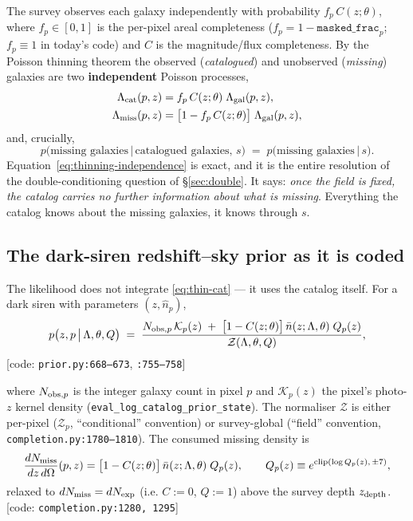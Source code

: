 The survey observes each galaxy independently with probability
$f_p\,C(z;\theta)$, where $f_p\in[0,1]$ is the per-pixel areal completeness
($f_p=1-\texttt{masked\_frac}_p$; $f_p\equiv1$ in today's code) and $C$ is the
magnitude/flux completeness.  By the Poisson thinning theorem the observed
(\emph{catalogued}) and unobserved (\emph{missing}) galaxies are two
\textbf{independent} Poisson processes,
\begin{align}
  \Lambda_{\rm cat}(p,z) &= f_p\,C(z;\theta)\;\Lambda_{\rm gal}(p,z), \label{eq:thin-cat}\\
  \Lambda_{\rm miss}(p,z) &= \big[1-f_p\,C(z;\theta)\big]\;\Lambda_{\rm gal}(p,z),
  \label{eq:thin-miss}
\end{align}
and, crucially,
\begin{equation}
  p\big(\text{missing galaxies}\,\big|\,\text{catalogued galaxies},\,s\big)
  \;=\;p\big(\text{missing galaxies}\,\big|\,s\big).
  \label{eq:thinning-independence}
\end{equation}
Equation~\eqref{eq:thinning-independence} is exact, and it is the entire
resolution of the double-conditioning question of \S\ref{sec:double}.  It says:
\emph{once the field is fixed, the catalog carries no further information about
what is missing}.  Everything the catalog knows about the missing galaxies, it
knows through $s$.

\subsection{The dark-siren redshift--sky prior as it is coded}

The likelihood does not integrate \eqref{eq:thin-cat} --- it uses the catalog
itself.  For a dark siren with parameters $(z,\hat n_p)$,
\begin{equation}
  p\big(z,p\,\big|\,\Lambda,\theta,Q\big)
  \;=\;\frac{N_{{\rm obs},p}\,\mathcal K_p(z)\;+\;\big[1-C(z;\theta)\big]\,
  \bar n(z;\Lambda,\theta)\;Q_p(z)}{\mathcal Z(\Lambda,\theta,Q)},
  \label{eq:zprior}
\end{equation}
\hfill[code: \texttt{prior.py:668--673}, \texttt{:755--758}]

\noindent where $N_{{\rm obs},p}$ is the integer galaxy count in pixel $p$ and
$\mathcal K_p(z)$ the pixel's photo-$z$ kernel density
(\verb|eval_log_catalog_prior_state|).  The normaliser $\mathcal Z$ is either
per-pixel ($\mathcal Z_p$, ``conditional'' convention) or survey-global
(``field'' convention, \texttt{completion.py:1780--1810}).  The consumed
missing density is
\begin{equation}
  \frac{dN_{\rm miss}}{dz\,d\Omega}(p,z)=\big[1-C(z;\theta)\big]\,
  \bar n(z;\Lambda,\theta)\;Q_p(z),\qquad
  Q_p(z)\equiv e^{\mathrm{clip}(\log Q_p(z),\,\pm7)},
  \label{eq:dNmiss}
\end{equation}
relaxed to $dN_{\rm miss}=dN_{\rm exp}$ (i.e. $C:=0$, $Q:=1$) above the survey
depth $z_{\rm depth}$.\hfill[code: \texttt{completion.py:1280,\,1295}]

